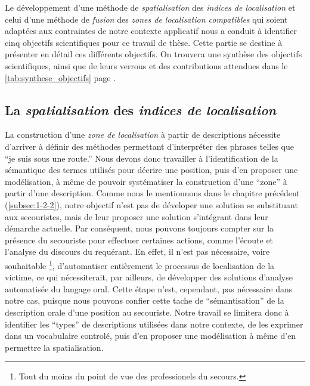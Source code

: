 Le développement d'une méthode de \emph{spatialisation} des
\emph{indices de localisation} et celui d'une méthode de \emph{fusion}
des \emph{zones de localisation compatibles} qui soient adaptées aux
contraintes de notre contexte applicatif nous a conduit à identifier
cinq objectifs scientifiques pour ce travail de thèse. Cette partie se
destine à présenter en détail ces différents objectifs.
On trouvera une synthèse des objectifs scientifiques, ainsi que de
leurs verrous et des contributions attendues dans le
\autoref{tab:synthese_objectifs} page
\pageref{tab:synthese_objectifs}.

\subsection{La \emph{spatialisation} des \emph{indices de
    localisation}}
\label{subsec:2-1-1}

La construction d'une \emph{zone de localisation} à partir de
descriptions nécessite d'arriver à définir des méthodes permettant
d'interpréter des phrases telles que \enquote{je suis sous une route.}
Nous devons donc travailler à l'identification de la sémantique des
termes utilisés pour décrire une position, puis d'en proposer une
modélisation, à même de pouvoir systématiser la construction d'une
\enquote{zone} à partir d'une description. Comme nous le mentionnons
dans le chapitre précédent (\ref{subsec:1-2-2}), notre objectif n'est
pas de déveloper une solution se substituant aux secouristes, mais de
leur proposer une solution s'intégrant dans leur démarche
actuelle. Par conséquent, nous pouvons toujours compter sur la
présence du secouriste pour effectuer certaines actions, comme
l'écoute et l'analyse du discours du requérant. En effet, il n'est pas
nécessaire, voire souhaitable \footnote{Tout du moins du point de vue
  des professionels du secours.}, d'automatiser entièrement le
processus de localisation de la victime, ce qui nécessiterait, par
ailleurs, de développer des solutions d'analyse automatisée du langage
oral. Cette étape n'est, cependant, pas nécessaire dans notre cas,
puisque nous pouvons confier cette tache de \enquote{sémantisation} de
la description orale d'une position au secouriste. Notre travail se
limitera donc à identifier les \enquote{types} de descriptions
utilisées dans notre contexte, de les exprimer dans un vocabulaire
controlé, puis d'en proposer une modélisation à même d'en permettre la
spatialisation.

